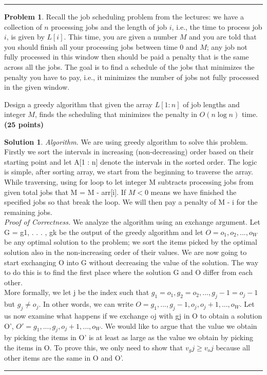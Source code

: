 \documentclass{article}
\theoremstyle{definition}
\newtheorem{problem}{Problem}
\def\fline{\rule{0.75\linewidth}{0.5pt}}
\newcommand{\finishline}{\begin{center}\fline\end{center}}
\newtheorem*{solution*}{Solution}
\newenvironment{solution}{\begin{solution*}}{{\finishline} \end{solution*}}
\newcommand{\grade}[1]{\hfill{\textbf{($\mathbf{#1}$ points)}}}
\begin{document}
\finishline




\begin{problem}
	Recall the job scheduling problem from the lectures: we have a collection of $n$ processing jobs and the length of job $i$, i.e., the time to process job $i$, is given by $L[i]$. This time, you are given a number $M$ and you are told that you should finish all your processing jobs between time $0$ and $M$; any job not fully processed in this window then should be paid a penalty that is the same across all the jobs. The goal is to find a schedule of the jobs that minimizes the penalty you have to pay, i.e., it minimizes the number of jobs not fully processed in the given window. 
	
	Design a greedy algorithm that given the array $L[1:n]$ of job lengths and integer $M$, finds the scheduling that minimizes the penalty in $O(n\log{n})$ time. \grade{25}


\bigskip

\begin{solution}
	
	\emph{Algorithm.} We are using greedy algorithm to solve this problem. Firstly we sort the intervals in increasing (non-decreasing) order based on their starting point and let A[1 : n] denote the intervals in the sorted order. The logic is simple, after sorting array, we start from the beginning to traverse the array. While traversing, using for loop to let integer M subtracts processing jobs from given total jobs that M = M - arr[i]. If $M < 0$ means we have finished the specified jobs so that break the loop. We will then pay a penalty of M - i for the remaining jobs.\\
	
	\emph{Proof of Correctness.} We analyze the algorithm using an exchange argument. Let G = {g1, . . . , gk} be the output of the greedy algorithm and let $O = {o_1, o_2, . . . , o_W}$ be any optimal solution to the problem; we sort the items picked by the optimal solution also in the non-increasing order of their values. We are now going to start exchanging O into G without decreasing the value of the solution. The way to do this is to find the first place where the solution G and O differ from each other. \\
		
	More formally, we let j be the index such that  ${g_1=o_1, g_2 = o_2, . . . , g_j-1=o_j-1} $but $g_j \ne o_j$. In other words, we can write $O = {g_1,..., g_j-1,o_j,o_j+1,...,o_W}$. Let us now examine what happens if we exchange oj with gj in O to obtain a solution O', $O' = {g_1, . . . , g_j , o_j+1, . . . , o_W } $. We would like to argue that the value we obtain by picking the items in O' is at least as large as the value we obtain by picking the items in O. To prove this, we only need to show that $v_gj \geq v_oj$ because all other items are the same in O and O'. \\
		

\end{solution}
\end{problem}
\end{document}
